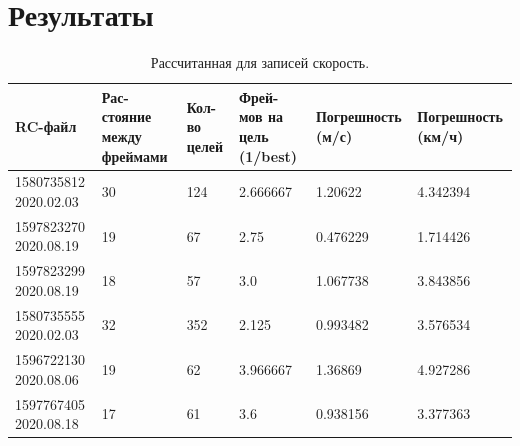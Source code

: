 \documentclass[specification,annotation,times]{itmo-student-thesis}
\begin{document}
	
	\chapter{Результаты}\label{sec:app:2}
	\begin{table}[!ht]
		\caption{Рассчитанная для записей скорость.}\label{tb1:res1}
		\centering
		\begin{tabular}{|p{}|p{}|p{}|p{}|p{}|p{}|}\hline
			\textbf{RC-файл}&	\textbf{Рас-стояние между фреймами}&	\textbf{Кол-во целей}&	\textbf{Фрей-мов на цель (1/best)}&	\textbf{Погрешность (м/с)}	& \textbf{Погрешность (км/ч)} \\\hline\hline
			1580735812 2020.02.03&	30	&124&	2.666667&	1.20622&	4.342394\\\hline
			1597823270 2020.08.19	&19&	67&	2.75&	0.476229&	1.714426\\\hline
			1597823299 2020.08.19	&18&	57	&3.0	&1.067738&	3.843856\\\hline
			1580735555 2020.02.03&	32	&352&	2.125&	0.993482&	3.576534\\\hline
			1596722130 2020.08.06&	19&	62&	3.966667&	1.36869&	4.927286\\\hline
			1597767405 2020.08.18&	17&	61&	3.6&	0.938156&	3.377363\\\hline
			
		\end{tabular}
	\end{table}
	
\end{document}

